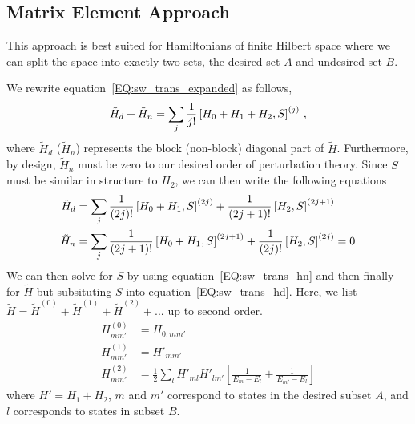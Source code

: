 \subsection{Matrix Element Approach}

This approach is best suited for Hamiltonians of finite Hilbert space where we can split the space into exactly two sets, the desired set $A$ and undesired set $B$.

We rewrite equation~\ref{EQ:sw_trans_expanded} as follows,
\begin{equation}
    \tilde{H}_d + \tilde{H}_n = \sum_j \frac{1}{j!}\left[H_0+H_1+H_2,S\right]^{(j)} \,,
\end{equation}
where $\tilde{H}_d$ ($\tilde{H}_n$) represents the block (non-block) diagonal part of $\tilde{H}$.
Furthermore, by design, $\tilde{H}_n$ must be zero to our desired order of perturbation theory.
Since $S$ must be similar in structure to $H_2$, we can then write the following equations
\begin{align}
    \tilde{H}_d & = \sum_j \frac{1}{(2j)!}\left[H_0+H_1,S\right]^{(2j)} + \frac{1}{(2j+1)!}\left[H_2,S\right]^{(2j+1)}     \label{EQ:sw_trans_hd} \\
    \tilde{H}_n & = \sum_j \frac{1}{(2j+1)!}\left[H_0+H_1,S\right]^{(2j+1)} + \frac{1}{(2j)!}\left[H_2,S\right]^{(2j)} = 0 \label{EQ:sw_trans_hn}
\end{align}
We can then solve for $S$ by using equation~\ref{EQ:sw_trans_hn} and then finally for $\tilde{H}$ but subsituting $S$ into equation~\ref{EQ:sw_trans_hd}. Here, we list $\tilde{H} = \tilde{H}^{(0)} + \tilde{H}^{(1)}+ \tilde{H}^{(2)}+...$ up to second order.
\begin{subequations}
    \begin{align}
        H^{(0)}_{mm'} & = H_{0,mm'}                                                                        \\
        H^{(1)}_{mm'} & = H'_{mm'}                                                                         \\
        H^{(2)}_{mm'} & = \frac{1}{2}\sum_l H'_{ml}H'_{lm'}\left[\frac1{E_m-E_l}+\frac1{E_{m'}-E_l}\right]
    \end{align}
\end{subequations}
where $H' = H_1 + H_2$, $m$ and $m'$ correspond to states in the desired subset $A$, and $l$ corresponds to states in subset $B$.
